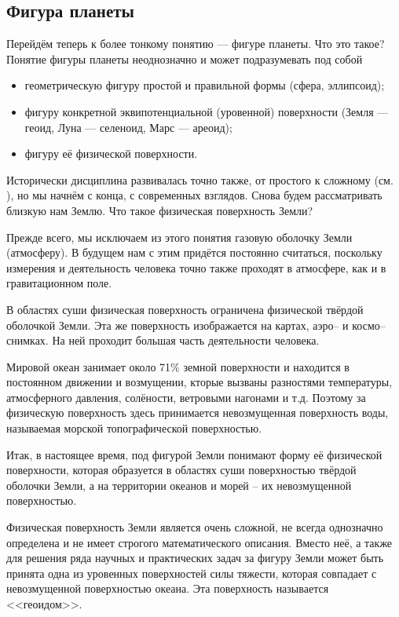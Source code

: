 \documentclass[11pt, a4paper]{article}
\theoremstyle{plain}
\theoremstyle{definition}
\theoremstyle{remark}
\begin{document}
\subsection{Фигура планеты}
Перейдём теперь к более тонкому понятию --- фигуре планеты. Что это такое? 
Понятие фигуры планеты неоднозначно и может подразумевать под собой
\begin{itemize}
    \item геометрическую фигуру простой и правильной формы (сфера, эллипсоид);
    \item фигуру конкретной эквипотенциальной (уровенной) поверхности (Земля --- геоид, Луна ---
        селеноид, Марс --- ареоид);
    \item фигуру её физической поверхности.
\end{itemize}
Исторически дисциплина развивалась точно также, от простого к сложному (см.
\cite{Ogorodova2013,Yuzefovich2014}), но мы начнём с конца, с современных взглядов. 
Снова будем рассматривать близкую нам Землю. Что такое физическая поверхность Земли?

Прежде всего, мы исключаем из этого понятия газовую оболочку Земли (атмосферу). В будущем нам с этим
придётся постоянно считаться, поскольку измерения и деятельность человека точно также проходят в
атмосфере, как и в гравитационном поле.

В областях суши физическая поверхность ограничена физической твёрдой оболочкой Земли. Эта же
поверхность изображается на картах, аэро-- и космо-- снимках. На ней проходит большая часть
деятельности человека. 

Мировой океан занимает около 71\% земной поверхности и находится в постоянном движении и
возмущении, кторые вызваны разностями температуры, атмосферного давления, солёности,
ветровыми нагонами и т.д. Поэтому за физическую поверхность здесь принимается невозмущенная поверхность
воды, называемая морской топографической поверхностью. 

Итак, в настоящее время, под фигурой Земли понимают форму её физической поверхности, которая
образуется в областях суши поверхностью твёрдой оболочки Земли, а на территории океанов и
морей -- их невозмущенной поверхностью. 

Физическая поверхность Земли является очень сложной, не всегда однозначно определена и не имеет 
строгого математического описания.
Вместо неё, а также для решения ряда научных и практических задач за фигуру Земли может быть принята
одна из уровенных поверхностей силы тяжести, которая совпадает с невозмущенной поверхностью океана.
Эта поверхность называется <<геоидом>>.
\end{document}
